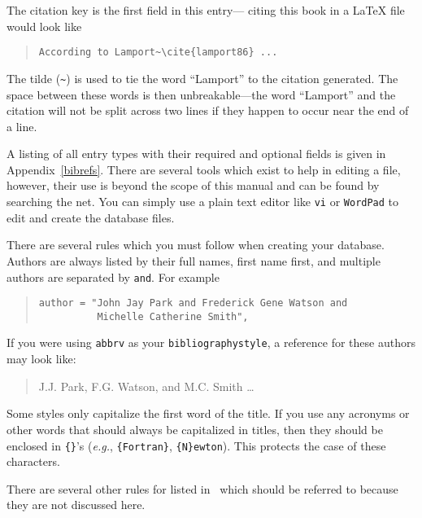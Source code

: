 The citation key is the first field in this entry--- citing this book in a \LaTeX{}
file would look like
\begin{quote}\singlespace\tt\begin{verbatim}
According to Lamport~\cite{lamport86} ...
\end{verbatim}\end{quote}
The tilde ({\tt \verb|~|}) is used to tie the word ``Lamport'' to the citation
generated.  The space between these words is then unbreakable---the word ``Lamport''
and the citation \cite{lamport} will not be split across two lines if they happen to occur
near the end of a line.

A listing of all entry types with their required and optional fields is given in 
Appendix~\ref{bibrefs}. There are several tools which exist to help in editing a \BibTeX{}
file, however, their use is beyond the scope of this manual and can be found by searching
the net.  You can simply use a plain text editor like {\tt vi} or {\tt WordPad} to edit
and create the database files.

There are several rules which you must follow when creating your database.  Authors are
always listed by their full names, first name first, and multiple authors are separated
by {\tt and}.  For example
\begin{quote}\singlespace\tt\begin{verbatim}
author = "John Jay Park and Frederick Gene Watson and
          Michelle Catherine Smith",
\end{verbatim}\end{quote}
If you were using {\tt abbrv} as your {\tt bibliographystyle}, a reference for these
authors may look like:
\begin{quote}
J.J. Park, F.G. Watson, and M.C. Smith \ldots
\end{quote}

Some styles only capitalize the first word of the title.  If you use any acronyms or
other words that should always be capitalized in titles, then they should be 
enclosed in {\tt \{\}}'s ({\em e.g.}, {\tt \{Fortran\}}, {\tt \{N\}ewton}).
This protects the case of these characters.

There are several other rules for \BibTeX{} listed in~\cite{lamport} which should be
referred to because they are not discussed here.


